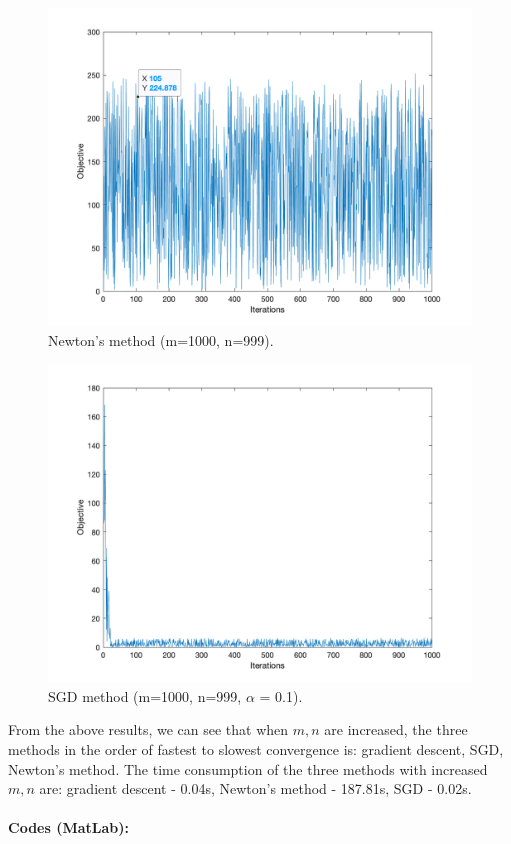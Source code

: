 \documentclass[11pt]{article}
\begin{document}
\begin{figure}[H] %
	\centering\includegraphics[width=0.6\linewidth]{fin_6_999_newton.png}
	\caption{Newton's method (m=1000, n=999).} %
	\label{fig:fig6}  %
\end{figure}
\begin{figure}[H] %
	\centering\includegraphics[width=0.6\linewidth]{fin_6 _999_sgd.png}
	\caption{SGD method (m=1000, n=999, $\alpha$ = 0.1).} %
	\label{fig:fig0}  %
\end{figure}
From the above results, we can see that when $m, n$ are increased, the three methods in the order of fastest to slowest convergence is: gradient descent, SGD, Newton's method.
The time consumption of the three methods with increased $m,n$ are: gradient descent - 0.04s, Newton's method - 187.81s, SGD - 0.02s. \\\\
\textbf{Codes (MatLab): }
\end{document}
